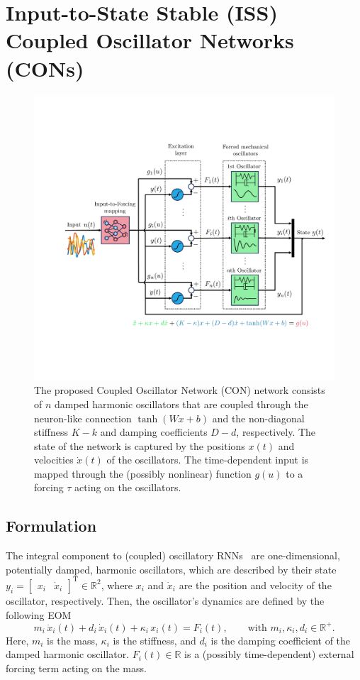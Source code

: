 \section{Input-to-State Stable (ISS) Coupled Oscillator Networks (CONs)}\label{sec:con:con}

\begin{figure}[t]
    \centering
    \includegraphics[width=0.8\linewidth]{con/figures/con/blockdiagram_coupled_oscillator_network_v2_cropped.pdf}
    \caption{The proposed Coupled Oscillator Network (CON) network consists of $n$ damped harmonic oscillators that are coupled through the neuron-like connection $\tanh(Wx+b)$ and the non-diagonal stiffness $K-k$ and damping coefficients $D-d$, respectively. The state of the network is captured by the positions $x(t)$ and velocities $\dot{x}(t)$ of the oscillators. The time-dependent input is mapped through the (possibly nonlinear) function $g(u)$ to a forcing $\tau$ acting on the oscillators.}
    \label{fig:con:con}
\end{figure}

\subsection{Formulation} 
The integral component to (coupled) oscillatory \glspl{RNN}~\citep{rusch2020coupled, rusch2021unicornn, ceni2024random, lanthaler2024neural} are one-dimensional, potentially damped, harmonic oscillators, which are described by their state $y_i = \begin{bmatrix}
    x_i & \dot{x}_i
\end{bmatrix}^\mathrm{T} \in \mathbb{R}^2$, where $x_i$ and $\dot{x}_i$ are the position and velocity of the oscillator, respectively. Then, the oscillator's dynamics are defined by the following \gls{EOM}
\begin{equation}\label{eq:con:harmonic_oscillator}
    m_i \, \ddot{x}_i(t) + d_i \, \dot{x}_i(t) + \kappa_i \, x_i(t) = F_i(t),
    \qquad
    \text{with } m_i, \kappa_i, d_i \in \mathbb{R}^+.
\end{equation}
Here, $m_i$ is the mass, $\kappa_i$ is the stiffness, and $d_i$ is the damping coefficient of the damped harmonic oscillator. $F_i(t) \in \mathbb{R}$ is a (possibly time-dependent) external forcing term acting on the mass.

